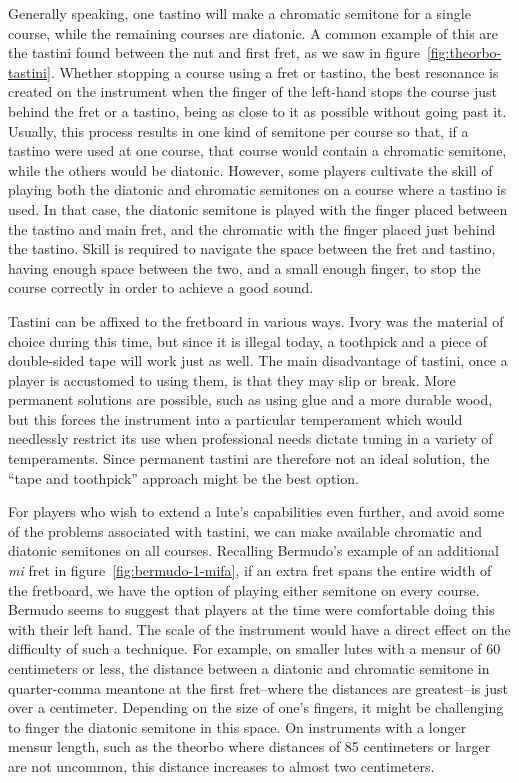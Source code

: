 Generally speaking, one tastino will make a chromatic semitone for a single course, while the
remaining courses are diatonic.  A common example of this are the tastini found between the nut and
first fret, as we saw in figure~\ref{fig:theorbo-tastini}. Whether stopping a course using a fret or
tastino, the best resonance is created on the instrument when the finger of the left-hand stops the
course just behind the fret or a tastino, being as close to it as possible without going past it.
Usually, this process results in one kind of semitone per course so that, if a tastino were used at
one course, that course would contain a chromatic semitone, while the others would be diatonic.
However, some players cultivate the skill of playing both the diatonic and chromatic semitones on a
course where a tastino is used. In that case, the diatonic semitone is played with the finger placed
between the tastino and main fret, and the chromatic with the finger placed just behind the
tastino.  Skill is required to navigate the space between the fret and tastino, having
enough space between the two, and a small enough finger, to stop the course correctly in order
to achieve a good sound.

Tastini can be affixed to the fretboard in various ways. Ivory was the material of choice during
this time, but since it is illegal today, a toothpick and a piece of double-sided tape will work
just as well.  The main disadvantage of tastini, once a player is accustomed to using them, is
that they may slip or break.  More permanent solutions are possible, such as using glue and a more
durable wood, but this forces the instrument into a particular temperament which would needlessly
restrict its use when professional needs dictate tuning in a variety of temperaments. Since
permanent tastini are therefore not an ideal solution, the ``tape and toothpick'' approach might be
the best option.

For players who wish to extend a lute's capabilities even further, and avoid
some of the problems associated with tastini, we can make available chromatic and diatonic
semitones on all courses. Recalling Bermudo's example of an additional
\textit{mi} fret in figure~\ref{fig:bermudo-1-mifa}, if an extra fret spans the entire
width of the fretboard, we have the option of playing either semitone on every course.
Bermudo seems to suggest that players at the time were comfortable doing this with their left
hand.  The scale of the instrument would have a direct effect on the difficulty of
such a technique.  For example, on smaller lutes with a mensur of 60 centimeters or
less, the distance between a diatonic and chromatic semitone in quarter-comma meantone
at the first fret--where the distances are greatest--is just over a centimeter.
Depending on the size of one's fingers, it might be challenging to finger the diatonic
semitone in this space.  On instruments with a longer mensur length, such as the
theorbo where distances of 85 centimeters or larger are not uncommon, this distance
increases to almost two centimeters.

